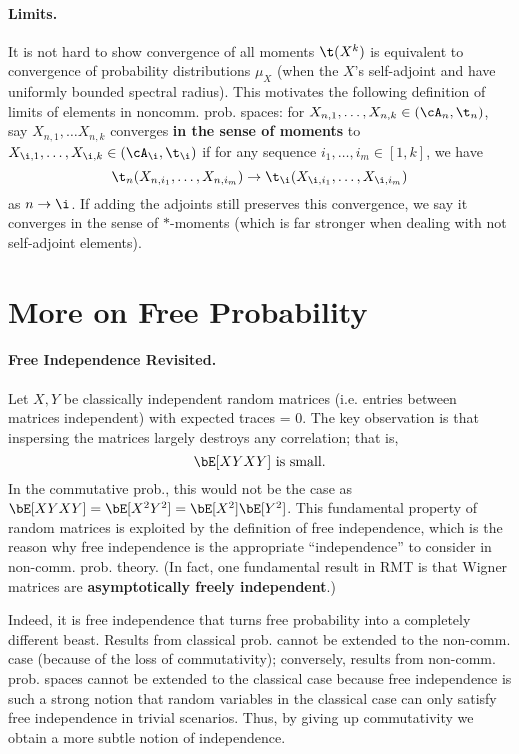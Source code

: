 \paragraph{Limits.} It is not hard to show convergence of all moments $\t(X^k)$ is equivalent to convergence of probability distributions $\mu_X$ (when the $X$'s self-adjoint and have uniformly bounded spectral radius). This motivates the following definition of limits of elements in noncomm. prob. spaces: for $X_{n,1}, \dots, X_{n,k} \in (\cA_n, \t_n)$, say $X_{n,1}, \dots X_{n,k}$ converges \textbf{in the sense of moments} to $X_{\i, 1}, \dots, X_{\i,k} \in (\cA_\i, \t_\i)$ if for any sequence $i_1, \dots, i_m \in [1,k]$, we have
\[
    \t_n(X_{n, i_1},\dots, X_{n,i_m}) \to \t_\i(X_{\i, i_1}, \dots, X_{\i,i_m})
\]
as $n \to \i$. If adding the adjoints still preserves this convergence, we say it converges in the sense of $*$-moments (which is far stronger when dealing with not self-adjoint elements).

\newpage

\section*{More on Free Probability}

\paragraph{Free Independence Revisited.} Let $X,Y$ be classically independent random matrices (i.e. entries between matrices independent) with expected traces = 0. The key observation is that inspersing the matrices largely destroys any correlation; that is,
\[
    \bE[XYXY] \text{ is small.}
\]
In the commutative prob., this would not be the case as $\bE[XYXY] = \bE[X^2Y^2] = \bE[X^2]\bE[Y^2]$. This fundamental property of random matrices is exploited by the definition of free independence, which is the reason why free independence is the appropriate ``independence'' to consider in non-comm. prob. theory. (In fact, one fundamental result in RMT is that Wigner matrices are \textbf{asymptotically freely independent}.)

Indeed, it is free independence that turns free probability into a completely different beast. Results from classical prob. cannot be extended to the non-comm. case (because of the loss of commutativity); conversely, results from non-comm. prob. spaces cannot be extended to the classical case because free independence is such a strong notion that random variables in the classical case can only satisfy free independence in trivial scenarios. Thus, by giving up commutativity we obtain a more subtle notion of independence.

